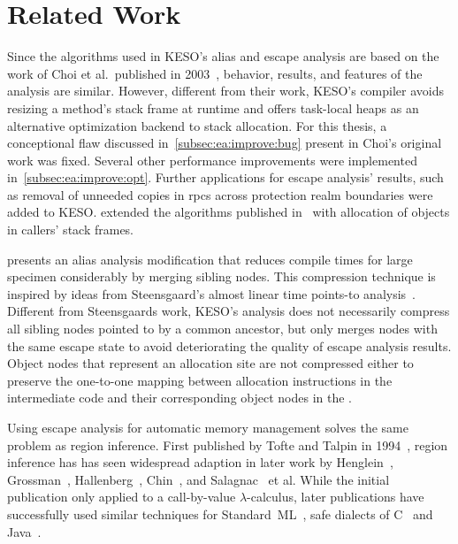 
\chapter{Related Work}
	\label{chapter:rel}
	Since the algorithms used in KESO's alias and escape analysis are based on the work of Choi et al.\ published in
	2003~\cite{choi:03:toplas}, behavior, results, and features of the analysis are similar. However, different from their
	work, KESO's compiler avoids resizing a method's stack frame at runtime and offers task-local heaps as an alternative
	optimization backend to stack allocation. For this thesis, a conceptional flaw discussed
	in~\cref{subsec:ea:improve:bug} present in Choi's original work was fixed. Several other performance improvements were
	implemented in~\cref{subsec:ea:improve:opt}. Further applications for escape analysis' results, such as removal of
	unneeded copies in \glspl{rpc} across protection realm boundaries were added to KESO.  extended the
	algorithms published in~\cite{choi:03:toplas} with allocation of objects in callers' stack frames.

	 presents an alias analysis modification that reduces compile times for large
	specimen considerably by merging sibling nodes. This compression technique is inspired by ideas from Steensgaard's
	almost linear time points-to analysis~\cite{steensgaard:96:popl}. Different from Steensgaards work, KESO's analysis
	does not necessarily compress all sibling nodes pointed to by a common ancestor, but only merges nodes with the same
	escape state to avoid deteriorating the quality of escape analysis results. Object nodes that represent an allocation
	site are not compressed either to preserve the one-to-one mapping between allocation instructions in the intermediate
	code and their corresponding object nodes in the .

	Using escape analysis for automatic memory management solves the same problem as region inference. First published by
	Tofte and Talpin in 1994~\cite{tofte:94:popl}, region inference has has seen widespread adaption in later work by
	Henglein~\cite{henglein:01:ppdp}, Grossman~\cite{grossman:02:pldi}, Hallenberg~\cite{hallenberg:02:sigplan},
	Chin~\cite{chin:04:pldi}, and Salagnac~\cite{salagnac:05:aiool, salagnac:07:rtcsa} et al. While the initial
	publication only applied to a call-by-value $\lambda$-calculus, later publications have successfully used similar
	techniques for Standard~ML~\cite{henglein:01:ppdp, hallenberg:02:sigplan}, safe dialects of C~\cite{grossman:02:pldi}
	and Java~\cite{chin:04:pldi, salagnac:05:aiool, salagnac:07:rtcsa}.

